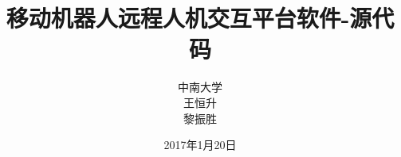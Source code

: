 \documentclass[a4paper,oneside,cs4size,fancyhdr,titlepage]{ctexart}
\title{移动机器人远程人机交互平台软件-源代码}
\author{中南大学\\王恒升\\黎振胜}
\date{2017年1月20日}
\begin{document}
\maketitle{}









































\end{document}
